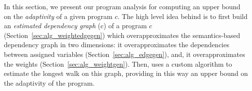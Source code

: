In this section, we present our program analysis {\THESYSTEM} for
computing an upper bound on the \emph{adaptivity} of a given program
$c$.  The high level idea behind {\THESYSTEM} is to first build
an \emph{estimated dependency graph} \progG(c) of a program $c$
(Section~\ref{sec:alg_weightedgegen}) which overapproximates the
semantics-based dependency graph in two dimensions: it
overapproximates the dependencies between assigned variables (Section~\ref{sec:alg_edgegen}), and, it
overapproximates the weights (Section~\ref{sec:alg_weightgen}). Then, {\THESYSTEM} uses a custom algorithm to estimate the longest
walk on this graph, providing in this way an upper bound on the adaptivity of the
program.





